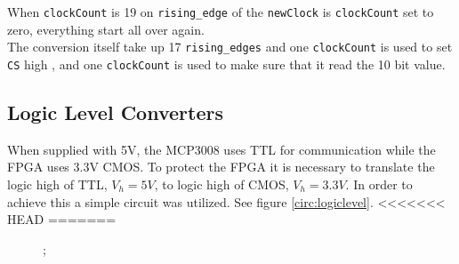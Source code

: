 When \texttt{clockCount} is 19 on \texttt{rising\_edge} of the \texttt{newClock} is \texttt{clockCount} set to zero, everything start all over again. \\

The conversion itself take up 17 \texttt{rising\_edges} and one \texttt{clockCount} is used to set \texttt{CS} high ,  and one \texttt{clockCount} is used to make sure that it read the 10 bit value. 



\subsection{Logic Level Converters}
When supplied with 5V, the MCP3008 uses TTL for communication while the FPGA uses 3.3V CMOS. To protect the FPGA it is necessary to translate the logic high of TTL, $V_h=5V$, to logic high of CMOS, $V_h=3.3V$. In order to achieve this a simple circuit was utilized. See figure \ref{circ:logiclevel}. 
<<<<<<< HEAD
=======
\begin{figure}
	\begin{circuitikz}
	;\end{circuitikz}
\end{figure}  
